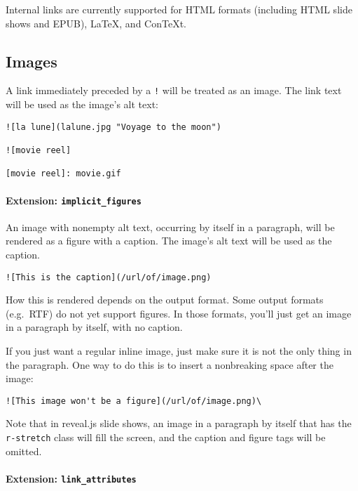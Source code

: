 \documentclass[
]{article}
\begin{document}
Internal links are currently supported for HTML formats (including HTML
slide shows and EPUB), LaTeX, and ConTeXt.

\hypertarget{images}{%
\subsection{Images}\label{images}}

A link immediately preceded by a \texttt{!} will be treated as an image.
The link text will be used as the image's alt text:

\begin{verbatim}
![la lune](lalune.jpg "Voyage to the moon")

![movie reel]

[movie reel]: movie.gif
\end{verbatim}

\hypertarget{extension-implicit_figures}{%
\paragraph{\texorpdfstring{Extension:
\texttt{implicit\_figures}}{Extension: implicit\_figures}}\label{extension-implicit_figures}}

An image with nonempty alt text, occurring by itself in a paragraph,
will be rendered as a figure with a caption. The image's alt text will
be used as the caption.

\begin{verbatim}
![This is the caption](/url/of/image.png)
\end{verbatim}

How this is rendered depends on the output format. Some output formats
(e.g.~RTF) do not yet support figures. In those formats, you'll just get
an image in a paragraph by itself, with no caption.

If you just want a regular inline image, just make sure it is not the
only thing in the paragraph. One way to do this is to insert a
nonbreaking space after the image:

\begin{verbatim}
![This image won't be a figure](/url/of/image.png)\
\end{verbatim}

Note that in reveal.js slide shows, an image in a paragraph by itself
that has the \texttt{r-stretch} class will fill the screen, and the
caption and figure tags will be omitted.

\hypertarget{extension-link_attributes}{%
\paragraph{\texorpdfstring{Extension:
\texttt{link\_attributes}}{Extension: link\_attributes}}\label{extension-link_attributes}}
\end{document}
